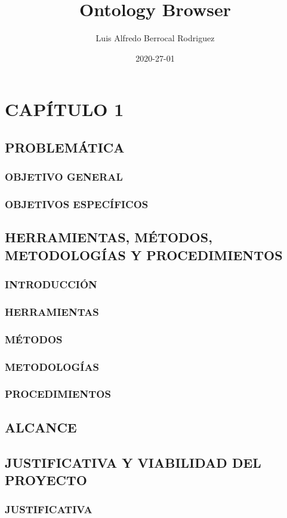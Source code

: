 \documentclass{report}
\title{Ontology Browser}
\date{2020-27-01}
\author{Luis Alfredo Berrocal Rodriguez}
\begin{document}
    \maketitle
    \newpage
    \chapter{CAPÍTULO 1}
    \section{PROBLEMÁTICA}
    \subsection{OBJETIVO GENERAL}
    \subsection{OBJETIVOS ESPECÍFICOS}
    \section{HERRAMIENTAS, MÉTODOS, METODOLOGÍAS Y PROCEDIMIENTOS}
    \subsection{INTRODUCCIÓN}
    \subsection{HERRAMIENTAS}
    \subsection{MÉTODOS}
    \subsection{METODOLOGÍAS}
    \subsection{PROCEDIMIENTOS}
    \section{ALCANCE}
    \section{JUSTIFICATIVA Y VIABILIDAD DEL PROYECTO}
    \subsection{JUSTIFICATIVA}
\end{document}
